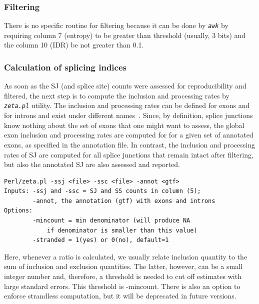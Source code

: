 \documentclass{article}
\newcommand{\prog}[1]{{\tt\em #1}}
\begin{document}

\subsubsection{Filtering}

There is no specific routine for filtering because it can be done by \prog{awk} by requiring column 7 (entropy)
to be greater than threshold (usually, 3 bits) and the column 10 (IDR) be not greater than 0.1.


\subsubsection{Calculation of splicing indices}
As soon as the SJ (and splice site) counts were assessed for reproducibility and filtered, the next step is to compute the inclusion and processing rates by \prog{zeta.pl} utility.
The inclusion and processing rates can be defined for exons and for introns and exist under different names~\cite{pmid23172860}. Since, by definition, splice junctions 
know nothing about the set of exons that one might want to assess, the  global exon inclusion and processing rates are computed for for a given set of 
annotated exons, as specified in the annotation file. In contrast, the inclusion and processing rates of SJ are computed for all splice junctions that remain
intact after filtering, but also the annotated SJ are also assessed and reported.

\begin{verbatim}
Perl/zeta.pl -ssj <file> -ssc <file> -annot <gtf>
Inputs: -ssj and -ssc = SJ and SS counts in column (5);
        -annot, the annotation (gtf) with exons and introns
Options:
        -mincount = min denominator (will produce NA 
            if denominator is smaller than this value)
        -stranded = 1(yes) or 0(no), default=1
\end{verbatim}
Here, whenever a ratio is calculated, we usually relate inclusion quantity to the sum of inclusion and exclusion quantities. The latter, however, can be a 
small integer number and, therefore, a threshold is needed to cut off estimates with large standard errors. This threshold is -mincount. There is also an option 
to enforce strandless computation, but it will be deprecated in future versions.
\end{document}
